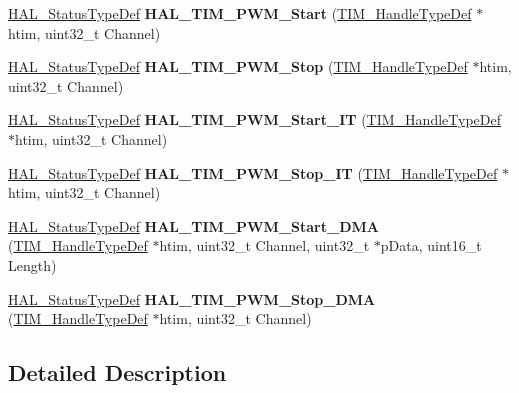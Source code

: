 \begin{DoxyCompactItemize}
\hyperlink{stm32f0xx__hal__def_8h_a63c0679d1cb8b8c684fbb0632743478f}{H\+A\+L\+\_\+\+Status\+Type\+Def} {\bfseries H\+A\+L\+\_\+\+T\+I\+M\+\_\+\+P\+W\+M\+\_\+\+Start} (\hyperlink{struct_t_i_m___handle_type_def}{T\+I\+M\+\_\+\+Handle\+Type\+Def} $\ast$htim, uint32\+\_\+t Channel)
\item 
\mbox{\label{group___t_i_m___exported___functions___group3_gae087011858379feeb770ecb4568829d3}} 
\hyperlink{stm32f0xx__hal__def_8h_a63c0679d1cb8b8c684fbb0632743478f}{H\+A\+L\+\_\+\+Status\+Type\+Def} {\bfseries H\+A\+L\+\_\+\+T\+I\+M\+\_\+\+P\+W\+M\+\_\+\+Stop} (\hyperlink{struct_t_i_m___handle_type_def}{T\+I\+M\+\_\+\+Handle\+Type\+Def} $\ast$htim, uint32\+\_\+t Channel)
\item 
\mbox{\label{group___t_i_m___exported___functions___group3_gaca1f5fbc35101d0fc7e8af31c9a0c26c}} 
\hyperlink{stm32f0xx__hal__def_8h_a63c0679d1cb8b8c684fbb0632743478f}{H\+A\+L\+\_\+\+Status\+Type\+Def} {\bfseries H\+A\+L\+\_\+\+T\+I\+M\+\_\+\+P\+W\+M\+\_\+\+Start\+\_\+\+IT} (\hyperlink{struct_t_i_m___handle_type_def}{T\+I\+M\+\_\+\+Handle\+Type\+Def} $\ast$htim, uint32\+\_\+t Channel)
\item 
\mbox{\label{group___t_i_m___exported___functions___group3_ga0559af125dc5fb2bb183a6a4b86808b5}} 
\hyperlink{stm32f0xx__hal__def_8h_a63c0679d1cb8b8c684fbb0632743478f}{H\+A\+L\+\_\+\+Status\+Type\+Def} {\bfseries H\+A\+L\+\_\+\+T\+I\+M\+\_\+\+P\+W\+M\+\_\+\+Stop\+\_\+\+IT} (\hyperlink{struct_t_i_m___handle_type_def}{T\+I\+M\+\_\+\+Handle\+Type\+Def} $\ast$htim, uint32\+\_\+t Channel)
\item 
\mbox{\label{group___t_i_m___exported___functions___group3_gaa4b542b3c0ae347ea580c9e7c8e88b17}} 
\hyperlink{stm32f0xx__hal__def_8h_a63c0679d1cb8b8c684fbb0632743478f}{H\+A\+L\+\_\+\+Status\+Type\+Def} {\bfseries H\+A\+L\+\_\+\+T\+I\+M\+\_\+\+P\+W\+M\+\_\+\+Start\+\_\+\+D\+MA} (\hyperlink{struct_t_i_m___handle_type_def}{T\+I\+M\+\_\+\+Handle\+Type\+Def} $\ast$htim, uint32\+\_\+t Channel, uint32\+\_\+t $\ast$p\+Data, uint16\+\_\+t Length)
\item 
\mbox{\label{group___t_i_m___exported___functions___group3_gad77367f9b8d8d17842a913f7d6ce274b}} 
\hyperlink{stm32f0xx__hal__def_8h_a63c0679d1cb8b8c684fbb0632743478f}{H\+A\+L\+\_\+\+Status\+Type\+Def} {\bfseries H\+A\+L\+\_\+\+T\+I\+M\+\_\+\+P\+W\+M\+\_\+\+Stop\+\_\+\+D\+MA} (\hyperlink{struct_t_i_m___handle_type_def}{T\+I\+M\+\_\+\+Handle\+Type\+Def} $\ast$htim, uint32\+\_\+t Channel)
\end{DoxyCompactItemize}


\subsection{Detailed Description}
